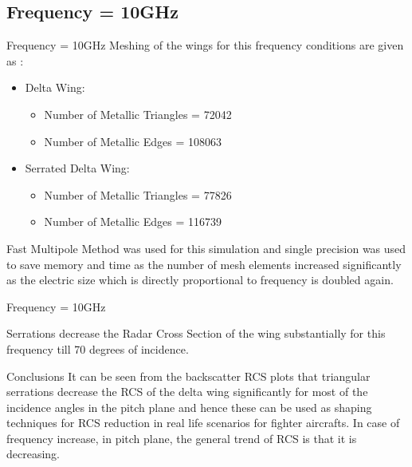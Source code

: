 \documentclass{beamer}
\begin{document}
\subsection{Frequency = 10GHz}
\begin{frame}{Frequency = 10GHz}
\justifying
Meshing of the wings for this frequency conditions are given as :
\begin{itemize}
\item Delta Wing:
\begin{itemize}
	\item Number of Metallic Triangles = 72042
	\item Number of Metallic Edges = 108063
\end{itemize}
\item Serrated Delta Wing:
\begin{itemize}
\item Number of Metallic Triangles = 77826
\item Number of Metallic Edges = 116739
\end{itemize}
\end{itemize}
Fast Multipole Method was used for this simulation and single precision was used to save memory and time as the number of mesh elements increased significantly as the electric size which is directly proportional to frequency is doubled again.
\end{frame}

\begin{frame}{Frequency = 10GHz}

Serrations decrease the Radar Cross Section of the wing substantially for this frequency till 70 degrees of incidence.
\end{frame}

\begin{frame}{Conclusions}
\justifying
It can be seen from the backscatter RCS plots that triangular serrations decrease the RCS of the delta wing significantly for most of the incidence angles in the pitch plane and hence these can be used as shaping techniques for RCS reduction in real life scenarios for fighter aircrafts. In case of frequency increase, in pitch plane, the general trend of RCS is that it is decreasing.

\end{frame}
\end{document}

